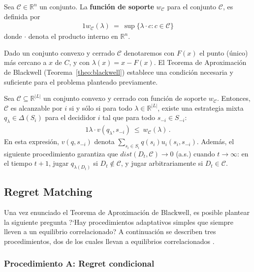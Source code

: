 \begin{definition}
\label{def:funcion-soporte}
Sea $\mathcal{C} \in \mathbb{R}^n$ un conjunto. La \textbf{función de soporte} $w_{\mathcal{C}}$ para el conjunto $\mathcal{C}$, es definida por
\begin{alignat}{1}
	w_{\mathcal{C}}(\lambda)\ =\ \sup\{\lambda \cdot c : c \in \mathcal{C} \}
\end{alignat}
donde $\cdot$ denota el producto interno en $\mathbb{R}^n$.
\end{definition}

Dado un conjunto convexo y cerrado $\mathcal{C}$ denotaremos con $F(x)$ el punto (único) más cercano a $x$ de $C$, y con $\lambda(x)= x - F(x)$.
El Teorema de Aproximación de Blackwell (Teorema~\ref{theo:blackwell}) establece una condición necesaria y suficiente para el problema planteado previamente.

\begin{theorem}
\label{theo:blackwell}
Sea $\mathcal{C} \subseteq \mathbb{R}^{|L|}$ un conjunto convexo y cerrado con función de soporte $w_{\mathcal{C}}$. Entonces, $\mathcal{C}$ es alcanzable por $i$ si y sólo si para todo $\lambda \in \mathbb{R}^{|L|}$, existe una estrategia mixta $q_{\lambda} \in \Delta(S_i)$ para el decididor $i$ tal que para todo $s_{-i}\in S_{-i}$:
\begin{alignat}{1}
  \lambda \cdot v(q_{\lambda}, s_{-i})\ \leq\ w_{\mathcal{C}}(\lambda) \,.
\end{alignat}
En esta expresión, $v(q, s_{-i})$ denota $\sum_{s_i \in S_i} q(s_i)u_i(s_i, s_{-i})$. 
Además, el siguiente procedimiento garantiza que $dist(D_t, \mathcal{C}) \rightarrow 0$ (a.s.) cuando $t \rightarrow \infty$: en el tiempo $t+1$, jugar $q_{\lambda(D_t)}$ si $D_t \notin \mathcal{C}$, y jugar arbitrariamente si $D_t \in \mathcal{C}$.
\end{theorem}


\subsection{Regret Matching}
Una vez enunciado el Teorema de Aproximación de Blackwell, es posible plantear la siguiente pregunta ?`Hay procedimientos adaptativos simples que siempre lleven a un equilibrio correlacionado? A continuación se describen tres procedimientos, dos de los cuales llevan a equilibrios correlacionados \cite{bib:correlated-equilibrium}.

\subsubsection{Procedimiento A: Regret condicional}

